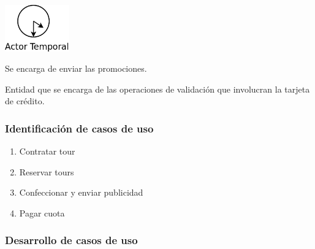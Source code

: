 \documentclass[12pt,a4paper,titlepage,oneside]{article}
\begin{document}
\vspace*{1.5cm}

\begin{minipage}[b]{0.2\linewidth}\centering
	\includegraphics[height=2cm]{actor_temporal}
\end{minipage}
\begin{minipage}[b]{0.8\linewidth}\centering
	\begin{flushleft}
	Se encarga de enviar las promociones. \\
	\end{flushleft}
\end{minipage}

\vspace*{1.5cm}


\begin{minipage}[b]{0.8\linewidth}\centering
	\begin{flushleft}
Entidad que se encarga de las operaciones de validación que involucran la tarjeta de crédito. \\
	\end{flushleft}
\end{minipage}


\vspace*{1.5cm}



\newpage

\subsubsection{Identificación de casos de uso}

\begin{enumerate}
\item Contratar tour
\item Reservar tours
\item Confeccionar y enviar publicidad
\item Pagar cuota
\end{enumerate}


\subsubsection{Desarrollo de casos de uso}
\end{document}
